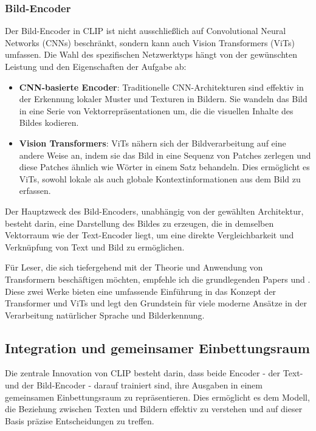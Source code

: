 \documentclass[nolibertine, ngerman, algorithm, nomencl, minted]{ttlab-qualify}
\begin{document}
\subsubsection{Bild-Encoder}
Der Bild-Encoder in CLIP ist nicht ausschließlich auf Convolutional Neural Networks (CNNs) beschränkt, sondern kann auch Vision Transformers (ViTs) umfassen. Die Wahl des spezifischen Netzwerktyps hängt von der gewünschten Leistung und den Eigenschaften der Aufgabe ab:
\begin{itemize}
    \item \textbf{CNN-basierte Encoder}: Traditionelle CNN-Architekturen sind effektiv in der Erkennung lokaler Muster und Texturen in Bildern. Sie wandeln das Bild in eine Serie von Vektorrepräsentationen um, die die visuellen Inhalte des Bildes kodieren.
    \item \textbf{Vision Transformers}: ViTs nähern sich der Bildverarbeitung auf eine andere Weise an, indem sie das Bild in eine Sequenz von Patches zerlegen und diese Patches ähnlich wie Wörter in einem Satz behandeln. Dies ermöglicht es ViTs, sowohl lokale als auch globale Kontextinformationen aus dem Bild zu erfassen.
\end{itemize}
Der Hauptzweck des Bild-Encoders, unabhängig von der gewählten Architektur, besteht darin, 
eine Darstellung des Bildes zu erzeugen, die in demselben Vektorraum wie der Text-Encoder liegt, 
um eine direkte Vergleichbarkeit und Verknüpfung von Text und Bild zu ermöglichen.

Für Leser, die sich tiefergehend mit der Theorie und Anwendung von Transformern beschäftigen möchten, 
empfehle ich die grundlegenden Papers \textcite{vaswani2017attention} und \textcite{dosovitskiy2020image}.
Diese zwei Werke bieten eine umfassende Einführung in das Konzept der Transformer und ViTs und legt 
den Grundstein für viele moderne Ansätze in der Verarbeitung natürlicher Sprache und Bilderkennung.

\subsection{Integration und gemeinsamer Einbettungsraum}
Die zentrale Innovation von CLIP besteht darin, dass beide Encoder - der Text- und der Bild-Encoder - darauf trainiert sind, ihre Ausgaben in einem gemeinsamen Einbettungsraum zu repräsentieren. Dies ermöglicht es dem Modell, die Beziehung zwischen Texten und Bildern effektiv zu verstehen und auf dieser Basis präzise Entscheidungen zu treffen.
\end{document}
